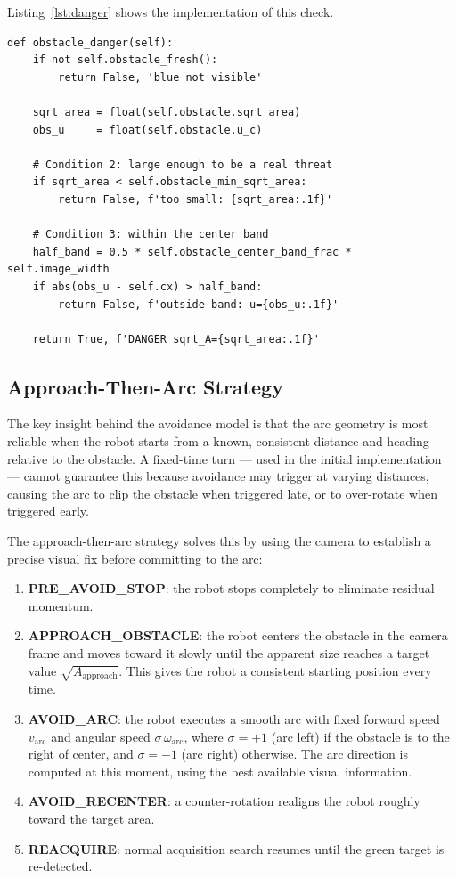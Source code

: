 \documentclass[journal, 10pt]{IEEEtran}
\begin{document}
Listing~\ref{lst:danger} shows the implementation of this check.

\begin{lstlisting}[caption={Obstacle danger condition check.},
                   label={lst:danger}]
def obstacle_danger(self):
    if not self.obstacle_fresh():
        return False, 'blue not visible'

    sqrt_area = float(self.obstacle.sqrt_area)
    obs_u     = float(self.obstacle.u_c)

    # Condition 2: large enough to be a real threat
    if sqrt_area < self.obstacle_min_sqrt_area:
        return False, f'too small: {sqrt_area:.1f}'

    # Condition 3: within the center band
    half_band = 0.5 * self.obstacle_center_band_frac * self.image_width
    if abs(obs_u - self.cx) > half_band:
        return False, f'outside band: u={obs_u:.1f}'

    return True, f'DANGER sqrt_A={sqrt_area:.1f}'
\end{lstlisting}

\subsection{Approach-Then-Arc Strategy}

The key insight behind the avoidance model is that the arc geometry is
most reliable when the robot starts from a known, consistent distance and
heading relative to the obstacle. A fixed-time turn --- used in the initial
implementation --- cannot guarantee this because avoidance may trigger at
varying distances, causing the arc to clip the obstacle when triggered
late, or to over-rotate when triggered early.

The approach-then-arc strategy solves this by using the camera to establish
a precise visual fix before committing to the arc:

\begin{enumerate}
  \item \textbf{PRE\_AVOID\_STOP}: the robot stops completely to eliminate
    residual momentum.
  \item \textbf{APPROACH\_OBSTACLE}: the robot centers the obstacle in the
    camera frame and moves toward it slowly until the apparent size reaches
    a target value $\sqrt{A_{\text{approach}}}$. This gives the robot a
    consistent starting position every time.
  \item \textbf{AVOID\_ARC}: the robot executes a smooth arc with fixed
    forward speed $v_{\text{arc}}$ and angular speed $\sigma\,\omega_{\text{arc}}$,
    where $\sigma = +1$ (arc left) if the obstacle is to the right of
    center, and $\sigma = -1$ (arc right) otherwise. The arc direction is
    computed at this moment, using the best available visual information.
  \item \textbf{AVOID\_RECENTER}: a counter-rotation realigns the robot
    roughly toward the target area.
  \item \textbf{REACQUIRE}: normal acquisition search resumes until the
    green target is re-detected.
\end{enumerate}
\end{document}
